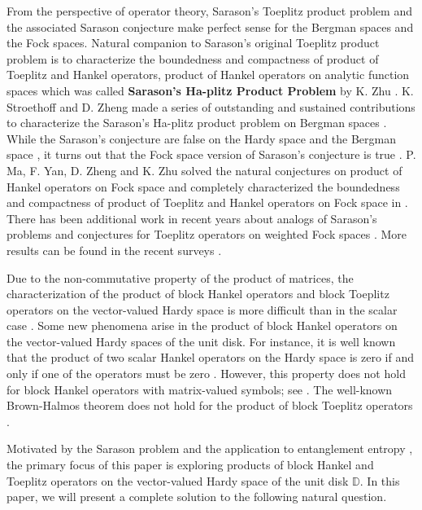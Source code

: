 \documentclass{article}%
\begin{document}
From the perspective of operator theory, Sarason’s Toeplitz product problem and the
associated Sarason conjecture make perfect sense for the Bergman spaces and the Fock spaces. Natural companion to Sarason’s original Toeplitz product problem is to characterize the boundedness and compactness of product of Toeplitz and Hankel operators, product of Hankel operators on analytic function spaces which was called \textbf{Sarason’s Ha-plitz Product Problem} by K. Zhu \cite{Zhu23}.
K. Stroethoff and D. Zheng made a series of outstanding and sustained contributions to characterize the Sarason’s Ha-plitz product problem on Bergman spaces \cite{strzheng1,strzheng2,strzheng3,strzheng4,strzheng5}. While the Sarason’s conjecture are false on the Hardy space \cite{Nazarov} and the Bergman space \cite{Alpore}, it turns out that the Fock space version of Sarason’s conjecture is true \cite{chpazh}. P. Ma, F. Yan, D. Zheng and K. Zhu \cite{mayanzhengzhu1} solved the natural conjectures on product of Hankel operators on Fock space and completely characterized the boundedness and compactness of product of Toeplitz and Hankel operators on Fock space in \cite{mayanzhengzhu2}. There has been additional work in recent years about analogs of Sarason’s problems and conjectures for Toeplitz operators on weighted Fock spaces \cite{BYZ,CWXC,FLL}. More results can be found in the recent surveys \cite{Virtanen22,Zhu23}.


Due to the non-commutative property of the product of
matrices, the characterization of the product of block Hankel operators and
block Toeplitz operators on the vector-valued Hardy space is more difficult
than in the scalar case \cite{GuZheng}. Some new phenomena arise in the
product of block Hankel operators on the vector-valued Hardy spaces of the
unit disk. For instance, it is well known that the product of two scalar
Hankel operators on the Hardy space is zero if and only if one of the
operators must be zero \cite{Brown Halmos}. However, this property does not
hold for block Hankel operators with matrix-valued symbols; see
\cite{Curto2023}. The well-known Brown-Halmos theorem does not hold for the
product of block Toeplitz operators \cite{GuZheng}.

Motivated by the Sarason problem \cite{Sarason problem} and the application to
entanglement entropy \cite{Basor}, the primary focus of this paper is
exploring products of block Hankel and Toeplitz operators on the vector-valued
Hardy space of the unit disk $\mathbb{D}$. In this paper, we will present a
complete solution to the following natural question.
\end{document}
